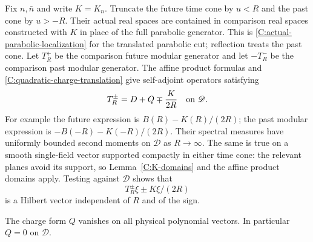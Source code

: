 Fix $n,\bar n$ and write $K=K_n$. Truncate the future time
cone by $u<R$ and the past cone by $u>-R$. Their actual
real spaces are contained in comparison real spaces
constructed with $K$ in place of the full parabolic
generator. This is \eqref{C:actual-parabolic-localization} for the
translated parabolic cut; reflection treats the past cone.
Let $T_R^+$ be the comparison future modular generator
and let $-T_R^-$ be the comparison past modular generator.
The affine product formulas and
\eqref{C:quadratic-charge-translation} give self-adjoint
operators satisfying
\begin{equation}\label{C:cone-comparison-generators}
 T_R^\pm=D+Q\mp\frac{K}{2R}\quad\hbox{on }\mathscr D.
\end{equation}
For example the future expression is
$B(R)-K(R)/(2R)$; the past modular expression is
$-B(-R)-K(-R)/(2R)$. Their spectral measures have uniformly
bounded second moments on $\mathscr D$ as $R\to\infty$.
The same is true on a smooth single-field vector supported
compactly in either time cone: the relevant planes avoid
its support, so Lemma~\ref{C:K-domains} and the affine
product domains apply. Testing against $\mathscr D$ shows
that
\[
 T_R^\pm\xi\pm K\xi/(2R)
\]
is a Hilbert vector independent of $R$ and of the sign.

\begin{proposition}\label{C:Q-zero}
The charge form $Q$ vanishes on all physical polynomial
vectors. In particular $Q=0$ on $\mathscr D$.
\end{proposition}

